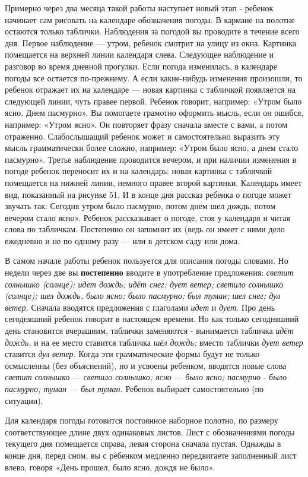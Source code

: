 \documentclass{book}
\renewcommand{\emph}[1]{\textit{#1}}
\begin{document}
Примерно через два месяца такой работы наступает новый этап - ребенок
начинает сам рисовать на календаре обозначения погоды. В кармане на
полотне остаются только таблички. Наблюдения за погодой вы проводите в
течение всего дня. Первое наблюдение --- утром, ребенок смотрит на улицу
из окна. Картинка помещается на верхней линии календаря слева. Следующее
наблюдение и разговор во время дневной прогулки. Если погода изменилась,
в календаре погоды все остается по-прежнему. А если какие-нибудь
изменения произошли, то ребенок отражает их на календаре --- новая
картинка с табличкой появляется на следующей линии, чуть правее первой.
Ребенок говорит, например: «Утром было ясно. Днем пасмурно». Вы
помогаете грамотно оформить мысль, если он ошибся, например: «Утром
ясно». Он повторяет фразу сначала вместе с вами, а потом отраженно.
Слабослышащий ребенок может и самостоятельно выразить эту мысль
грамматически более сложно, например: «Утром было ясно, а днем стало
пасмурно». Третье наблюдение проводится вечером, и при наличии изменения
в погоде ребенок переносит их и на календарь: новая картинка с табличкой
помещается на нижней линии, немного правее второй картинки. Календарь
имеет вид, показанный на рисунке 51. И в конце дня рассказ ребенка о
погоде может звучать так: Сегодня утром было пасмурно, потом днем шел
дождь, потом вечером стало ясно». Ребенок рассказывает о погоде, стоя у
календаря и читая слова по табличкам. Постепенно он запомнит их (ведь он
имеет с ними дело ежедневно и не по одному разу --- или в детском саду
или дома.

В самом начале работы ребенок пользуется для описания погоды словами. Но
недели через две вы \textbf{постепенно} вводите в употребление
предложения: \emph{светит солнышко (солнце); идет дождь; идёт снег; дует
ветер; светило солнышко (солнце); шел дождь, было ясно; было пасмурно;
был туман; шел снег; дул ветер.} Сначала вводятся предложения с
глаголами \emph{идет} и \emph{дует.} Про день сегодняшний ребенок
говорит в настоящем времени. Но как только сегодняшний день становится
вчерашним, таблички заменяются - вынимается табличка \emph{идёт дождь,}
и на ее место ставится табличка \emph{шёл дождь;} вместо таблички
\emph{дует ветер} ставится \emph{дул} \emph{ветер.} Когда эти
грамматические формы будут не только осмысленны (без объяснений), но и
усвоены ребенком, вводятся новые слова \emph{светит солнышко} ---
\emph{светило солнышко; ясно} --- \emph{было ясно; пасмурно} -
\emph{было пасмурно; туман --- был туман.} Ребенок выбирает
самостоятельно (по ситуации).

Для календаря погоды готовится постоянное наборное полотно, по размеру
соответствующее длине двух одинаковых листов. Лист с обозначениями
погоды текущего дня помещается справа, левая сторона сначала пустая.
Однажды в конце дня, перед сном, вы с ребенком медленно передвигаете
заполненный лист влево, говоря «День прошел, было ясно, дождя не было».
\end{document}
